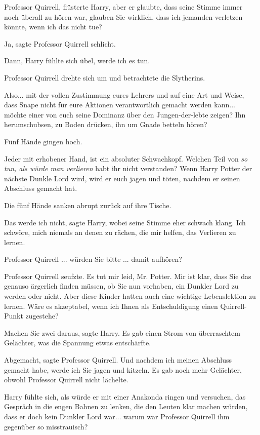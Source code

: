 \glqq Professor Quirrell\grqq{}, flüsterte Harry, aber er glaubte, dass seine
Stimme immer noch überall zu hören war, \glqq glauben Sie wirklich, dass ich
jemanden verletzen könnte, wenn ich das nicht tue?\grqq{}

\glqq Ja\grqq{}, sagte Professor Quirrell schlicht.

\glqq Dann\grqq{}, Harry fühlte sich übel, \glqq werde ich es tun.\grqq{}

Professor Quirrell drehte sich um und betrachtete die Slytherins.

\glqq Also... mit der vollen Zustimmung eures Lehrers und auf eine Art und
Weise, dass Snape nicht für eure Aktionen verantwortlich gemacht werden kann...
möchte einer von euch seine Dominanz über den Jungen-der-lebte zeigen? Ihn
herumschubsen, zu Boden drücken, ihn um Gnade betteln hören?\grqq{}

Fünf Hände gingen hoch.

\glqq Jeder mit erhobener Hand, ist ein absoluter Schwachkopf. Welchen Teil von
\emph{\glqq so tun, als würde man verlieren\grqq{} } habt ihr nicht verstanden?
Wenn Harry Potter der nächste Dunkle Lord wird, wird er euch jagen und töten,
nachdem er seinen Abschluss gemacht hat.\grqq{}

Die fünf Hände sanken abrupt zurück auf ihre Tische.

\glqq Das werde ich nicht\grqq{}, sagte Harry, wobei seine Stimme eher schwach
klang. \glqq Ich schwöre, mich niemals an denen zu rächen, die mir helfen, das
Verlieren zu lernen.

Professor Quirrell ... würden Sie bitte ... damit aufhören?\grqq{}

Professor Quirrell seufzte. \glqq Es tut mir leid, Mr. Potter. Mir ist klar,
dass Sie das genauso ärgerlich finden müssen, ob Sie nun vorhaben, ein Dunkler
Lord zu werden oder nicht. Aber diese Kinder hatten auch eine wichtige
Lebenslektion zu lernen. Wäre es akzeptabel, wenn ich Ihnen als Entschuldigung
einen Quirrell-Punkt zugestehe?\grqq{}

\glqq Machen Sie zwei daraus\grqq{}, sagte Harry. Es gab einen Strom von
überraschtem Gelächter, was die Spannung etwas entschärfte.

\glqq Abgemacht\grqq{}, sagte Professor Quirrell. \glqq Und nachdem ich meinen
Abschluss gemacht habe, werde ich Sie jagen und kitzeln.\grqq{} Es gab noch mehr
Gelächter, obwohl Professor Quirrell nicht lächelte.

Harry fühlte sich, als würde er mit einer Anakonda ringen und versuchen, das
Gespräch in die engen Bahnen zu lenken, die den Leuten klar machen würden, dass
er doch kein Dunkler Lord war... warum war Professor Quirrell ihm gegenüber so
misstrauisch?

